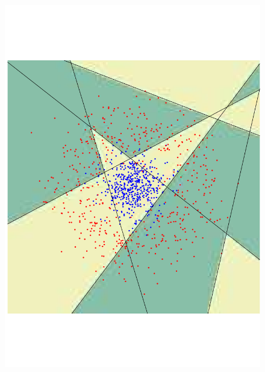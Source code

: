 \begin{figure}
\begin{center}
 \includegraphics[angle=270, scale=0.166]{ch4/figures/87.pdf}\\

\end{center}
\end{figure}
